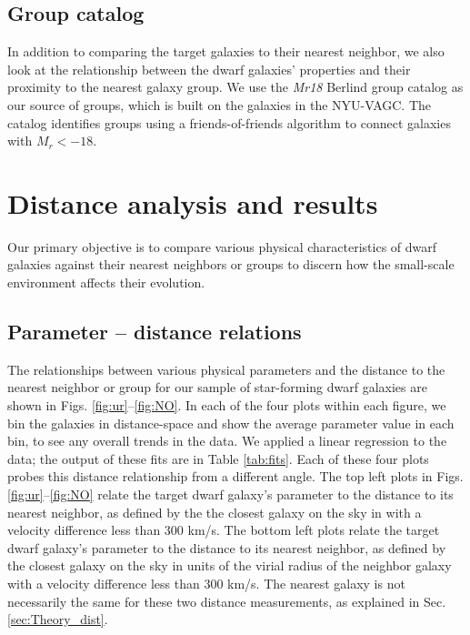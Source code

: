 \subsection{Group catalog}

In addition to comparing the target galaxies to their nearest neighbor, we also 
look at the relationship between the dwarf galaxies' properties and their 
proximity to the nearest galaxy group.  We use the \emph{Mr18} Berlind group 
catalog \cite{Berlind06} as our source of groups, which is built on the galaxies 
in the NYU-VAGC. The catalog identifies groups using a friends-of-friends 
algorithm \citep{Huchra82} to connect galaxies with $M_r < -18$.




\section[Analysis \& Results]{Distance analysis and results}

Our primary objective is to compare various physical characteristics of dwarf 
galaxies against their nearest neighbors or groups to discern how the 
small-scale environment affects their evolution.


\subsection{Parameter -- distance relations}\label{sec:Relations}

The relationships between various physical parameters and the distance to the 
nearest neighbor or group for our sample of star-forming dwarf galaxies are 
shown in Figs. \ref{fig:ur}--\ref{fig:NO}.  In each of the four plots within 
each figure, we bin the galaxies in distance-space and show the average 
parameter value in each bin, to see any overall trends in the data.  We applied 
a linear regression to the data; the output of these fits are in Table 
\ref{tab:fits}.  Each of these four plots probes this distance relationship from 
a different angle.  The top left plots in Figs. \ref{fig:ur}--\ref{fig:NO} 
relate the target dwarf galaxy's parameter to the distance to its nearest 
neighbor, as defined by the the closest galaxy on the sky in \hMpc with a 
velocity difference less than 300 km/s.  The bottom left plots relate the target 
dwarf galaxy's parameter to the distance to its nearest neighbor, as defined by 
the closest galaxy on the sky in units of the virial radius of the neighbor 
galaxy with a velocity difference less than 300 km/s.  The nearest galaxy is not 
necessarily the same for these two distance measurements, as explained in Sec. 
\ref{sec:Theory_dist}.

